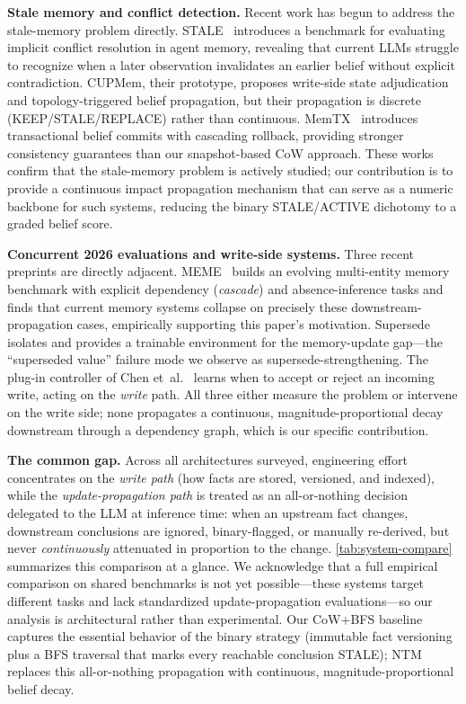 \documentclass{article}
\theoremstyle{definition}
\begin{document}
\textbf{Stale memory and conflict detection.} Recent work has begun to
address the stale-memory problem directly. STALE~\cite{stale2026}
introduces a benchmark for evaluating implicit conflict resolution in
agent memory, revealing that current LLMs struggle to recognize when a
later observation invalidates an earlier belief without explicit
contradiction. CUPMem, their prototype, proposes write-side state
adjudication and topology-triggered belief propagation, but their
propagation is discrete (KEEP/STALE/REPLACE) rather than continuous.
MemTX~\cite{memtx2026} introduces transactional belief commits with
cascading rollback, providing stronger consistency guarantees than our
snapshot-based CoW approach. These works confirm that the stale-memory
problem is actively studied; our contribution is to provide a continuous
impact propagation mechanism that can serve as a numeric backbone for
such systems, reducing the binary STALE/ACTIVE dichotomy to a graded
belief score.

\textbf{Concurrent 2026 evaluations and write-side systems.}  Three
recent preprints are directly adjacent.  MEME~\cite{meme2026} builds an
evolving multi-entity memory benchmark with explicit dependency
(\emph{cascade}) and absence-inference tasks and finds that current
memory systems collapse on precisely these downstream-propagation
cases, empirically supporting this paper's motivation.
Supersede~\cite{supersede2026} isolates and provides a trainable
environment for the memory-update gap---the ``superseded value'' failure
mode we observe as supersede-strengthening.  The plug-in controller of
Chen et~al.~\cite{past2026} learns when to accept or reject an incoming
write, acting on the \emph{write} path.  All three either measure the
problem or intervene on the write side; none propagates a continuous,
magnitude-proportional decay downstream through a dependency graph,
which is our specific contribution.

\textbf{The common gap.}  Across all architectures surveyed, engineering
effort concentrates on the \emph{write path} (how facts are stored,
versioned, and indexed), while the \emph{update-propagation path} is
treated as an all-or-nothing decision delegated to the LLM at inference
time: when an upstream fact changes, downstream conclusions are ignored,
binary-flagged, or manually re-derived, but never \emph{continuously}
attenuated in proportion to the change.  \cref{tab:system-compare}
summarizes this comparison at a glance.  We acknowledge that a full
empirical comparison on shared benchmarks is not yet possible---these
systems target different tasks and lack standardized update-propagation
evaluations---so our analysis is architectural rather than experimental.
Our CoW$+$BFS baseline captures the essential behavior of the binary
strategy (immutable fact versioning plus a BFS traversal that marks every
reachable conclusion STALE); NTM replaces this all-or-nothing propagation
with continuous, magnitude-proportional belief decay.
\end{document}
